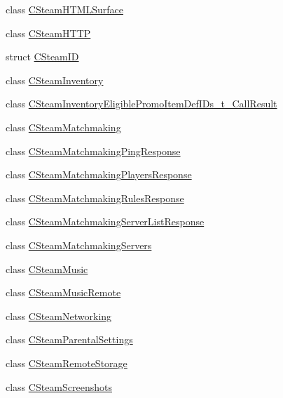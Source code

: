 \begin{DoxyCompactItemize}
\item 
class \hyperlink{class_valve_1_1_steamworks_1_1_c_steam_h_t_m_l_surface}{C\+Steam\+H\+T\+M\+L\+Surface}
\item 
class \hyperlink{class_valve_1_1_steamworks_1_1_c_steam_h_t_t_p}{C\+Steam\+H\+T\+TP}
\item 
struct \hyperlink{struct_valve_1_1_steamworks_1_1_c_steam_i_d}{C\+Steam\+ID}
\item 
class \hyperlink{class_valve_1_1_steamworks_1_1_c_steam_inventory}{C\+Steam\+Inventory}
\item 
class \hyperlink{class_valve_1_1_steamworks_1_1_c_steam_inventory_eligible_promo_item_def_i_ds__t___call_result}{C\+Steam\+Inventory\+Eligible\+Promo\+Item\+Def\+I\+Ds\+\_\+t\+\_\+\+Call\+Result}
\item 
class \hyperlink{class_valve_1_1_steamworks_1_1_c_steam_matchmaking}{C\+Steam\+Matchmaking}
\item 
class \hyperlink{class_valve_1_1_steamworks_1_1_c_steam_matchmaking_ping_response}{C\+Steam\+Matchmaking\+Ping\+Response}
\item 
class \hyperlink{class_valve_1_1_steamworks_1_1_c_steam_matchmaking_players_response}{C\+Steam\+Matchmaking\+Players\+Response}
\item 
class \hyperlink{class_valve_1_1_steamworks_1_1_c_steam_matchmaking_rules_response}{C\+Steam\+Matchmaking\+Rules\+Response}
\item 
class \hyperlink{class_valve_1_1_steamworks_1_1_c_steam_matchmaking_server_list_response}{C\+Steam\+Matchmaking\+Server\+List\+Response}
\item 
class \hyperlink{class_valve_1_1_steamworks_1_1_c_steam_matchmaking_servers}{C\+Steam\+Matchmaking\+Servers}
\item 
class \hyperlink{class_valve_1_1_steamworks_1_1_c_steam_music}{C\+Steam\+Music}
\item 
class \hyperlink{class_valve_1_1_steamworks_1_1_c_steam_music_remote}{C\+Steam\+Music\+Remote}
\item 
class \hyperlink{class_valve_1_1_steamworks_1_1_c_steam_networking}{C\+Steam\+Networking}
\item 
class \hyperlink{class_valve_1_1_steamworks_1_1_c_steam_parental_settings}{C\+Steam\+Parental\+Settings}
\item 
class \hyperlink{class_valve_1_1_steamworks_1_1_c_steam_remote_storage}{C\+Steam\+Remote\+Storage}
\item 
class \hyperlink{class_valve_1_1_steamworks_1_1_c_steam_screenshots}{C\+Steam\+Screenshots}

\end{DoxyCompactItemize}
